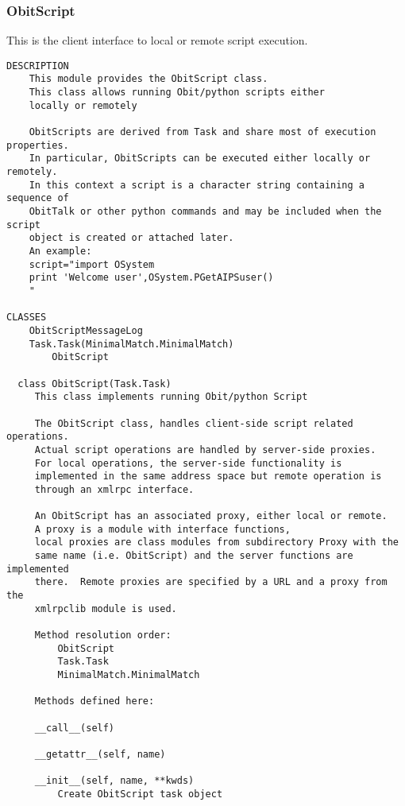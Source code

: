 \documentclass[11pt]{report}
\begin{document}
\subsubsection{ObitScript}
This is the client interface to local or remote script execution.
\begin{verbatim}
DESCRIPTION
    This module provides the ObitScript class.
    This class allows running Obit/python scripts either
    locally or remotely
    
    ObitScripts are derived from Task and share most of execution properties.
    In particular, ObitScripts can be executed either locally or remotely.
    In this context a script is a character string containing a sequence of
    ObitTalk or other python commands and may be included when the script
    object is created or attached later.
    An example:
    script="import OSystem
    print 'Welcome user',OSystem.PGetAIPSuser()
    "

CLASSES
    ObitScriptMessageLog
    Task.Task(MinimalMatch.MinimalMatch)
        ObitScript
    
  class ObitScript(Task.Task)
     This class implements running Obit/python Script
     
     The ObitScript class, handles client-side script related operations.
     Actual script operations are handled by server-side proxies.
     For local operations, the server-side functionality is
     implemented in the same address space but remote operation is
     through an xmlrpc interface.  
     
     An ObitScript has an associated proxy, either local or remote.
     A proxy is a module with interface functions,
     local proxies are class modules from subdirectory Proxy with the
     same name (i.e. ObitScript) and the server functions are implemented
     there.  Remote proxies are specified by a URL and a proxy from the
     xmlrpclib module is used.
     
     Method resolution order:
         ObitScript
         Task.Task
         MinimalMatch.MinimalMatch
     
     Methods defined here:
     
     __call__(self)
     
     __getattr__(self, name)
     
     __init__(self, name, **kwds)
         Create ObitScript task object
         

\end{verbatim}
\end{document}
